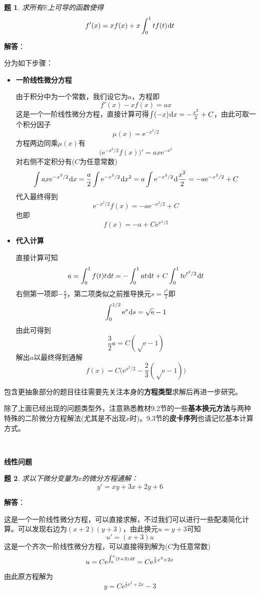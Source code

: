\documentclass[a4paper,UTF8,fontset=windows,AutoFakeBold]{ctexart}
\newcommand*{\dr}{\hspace{0.07em}\mathrm{d}}
\newcommand*{\er}{\mathrm{e}}
\newcommand*{\rb}{\mathbb{R}}
\newcommand*{\note}{\noindent *}
\theoremstyle{ex}
\newtheorem{exercise}{题}
\newcommand{\sol}[1]{{\vspace{5pt}\kaishu\noindent\textbf{解答}：\vspace{-3pt}
\begin{compactitem}
    \item[] #1
\end{compactitem}
}}
\begin{document}
\begin{framed}
\begin{exercise}
    求所有$\rb$上可导的函数使得
    $$f'(x)=xf(x)+x\int_0^1tf(t)\dr t$$
\end{exercise}
\sol{
    分为如下步骤：
    \begin{itemize}
        \item \textbf{一阶线性微分方程}
        
        由于积分中为一个常数，我们设它为$a$，方程即
        $$f'(x)-xf(x)=ax$$
        这是一个一阶线性微分方程，直接计算可得$\int(-x)\dr x=-\frac{x^2}{2}+C$，由此可取一个积分因子
        $$\mu(x)=\er^{-x^2/2}$$
        方程两边同乘$\mu(x)$有
        $$\big(\er^{-x^2/2}f(x)\big)'=ax\er^{-x^2}$$
        对右侧不定积分有($C$为任意常数)
        $$\int ax\er^{-x^2/2}\dr x=\frac{a}{2}\int\er^{-x^2/2}\dr x^2=a\int\er^{-x^2/2}\dr\frac{x^2}{2}=-a\er^{-x^2/2}+C$$
        代入最终得到
        $$\er^{-x^2/2}f(x)=-a\er^{-x^2/2}+C$$
        也即
        $$f(x)=-a+C\er^{x^2/2}$$
        
        \item \textbf{代入计算}
        
        直接计算可知
        $$a=\int_0^1f(t)t\dr t=-\int_0^1at\dr t+C\int_0^1t\er^{t^2/2}\dr t$$
        右侧第一项即$-\frac{a}{2}$，第二项类似之前推导换元$s=\frac{t^2}{2}$即
        $$\int_0^{1/2}\er^s\dr s=\sqrt\er-1$$
        由此可得到
        $$\frac{3}{2}a=C(\sqrt\er-1)$$
        解出$a$以最终得到通解
        $$f(x)=C\bigg(\er^{x^2/2}-\frac{2}{3}(\sqrt\er-1)\bigg)$$
    \end{itemize}
}
\end{framed}

\note 包含更抽象部分的题目往往需要先关注本身的\textbf{方程类型}求解后再进一步研究。

\note 除了上面已经出现的问题类型外，注意熟悉教材9.2节的一些\textbf{基本换元方法}与两种特殊的二阶微分方程解法(尤其是不出现$x$时)。9.3节的\textbf{皮卡序列}也请记忆基本计算方式。

\

\noindent\textbf{线性问题}
\begin{framed}
\begin{exercise}
    求以下微分变量为$x$的微分方程通解：
    $$y'=xy+3x+2y+6$$
\end{exercise}
\sol{
    这是一个一阶线性微分方程，可以直接求解，不过我们可以进行一些配凑简化计算。可以发现右边为$(x+2)(y+3)$，由此换元$u=y+3$可知
    $$u'=(x+3)u$$
    这是一个齐次一阶线性微分方程，可以直接得到解为($C$为任意常数)
    $$u=C\er^{\int_0^x(t+3)\dr t}=C\er^{\frac{1}{2}x^2+2x}$$
    由此原方程解为
    $$y=C\er^{\frac{1}{2}x^2+2x}-3$$
}
\end{framed}
\end{document}
